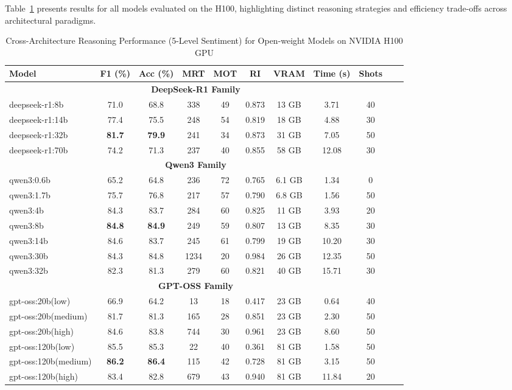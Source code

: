 \documentclass[conference]{IEEEtran}
\begin{document}
Table~\ref{tab:cross_architecture_results} presents results for all models evaluated on the H100, highlighting distinct reasoning strategies and efficiency trade-offs across architectural paradigms.

\begin{table}[htbp]
\caption{Cross-Architecture Reasoning Performance (5-Level Sentiment) for Open-weight Models on NVIDIA H100 GPU}
\centering
\begin{tabular}{lcccccccccc}
\toprule
\textbf{Model} & \textbf{F1 (\%)} & \textbf{Acc (\%)} & \textbf{MRT} & \textbf{MOT} & \textbf{RI} & \textbf{VRAM} & \textbf{Time (s)} & \textbf{Shots} \\
\midrule
\multicolumn{9}{c}{\textbf{DeepSeek-R1 Family}} \\
\midrule
deepseek-r1:8b & 71.0 & 68.8 & 338 & 49 & 0.873 & 13 GB & 3.71 & 40 \\
deepseek-r1:14b & 77.4 & 75.5 & 248 & 54 & 0.819 & 18 GB & 4.88 & 30 \\
deepseek-r1:32b & \textbf{81.7} & \textbf{79.9} & 241 & 34 & 0.873 & 31 GB & 7.05 & 50 \\
deepseek-r1:70b & 74.2 & 71.3 & 237 & 40 & 0.855 & 58 GB & 12.08 & 30 \\
\midrule
\multicolumn{9}{c}{\textbf{Qwen3 Family}} \\
\midrule
qwen3:0.6b & 65.2 & 64.8 & 236 & 72 & 0.765 & 6.1 GB & 1.34 & 0 \\
qwen3:1.7b & 75.7 & 76.8 & 217 & 57 & 0.790 & 6.8 GB & 1.56 & 50 \\
qwen3:4b & 84.3 & 83.7 & 284 & 60 & 0.825 & 11 GB & 3.93 & 20 \\
qwen3:8b & \textbf{84.8} & \textbf{84.9} & 249 & 59 & 0.807 & 13 GB & 8.35 & 30 \\
qwen3:14b & 84.6 & 83.7 & 245 & 61 & 0.799 & 19 GB & 10.20 & 30 \\
qwen3:30b & 84.3 & 84.8 & 1234 & 20 & 0.984 & 26 GB & 12.35 & 50 \\
qwen3:32b & 82.3 & 81.3 & 279 & 60 & 0.821 & 40 GB & 15.71 & 30 \\
\midrule
\multicolumn{9}{c}{\textbf{GPT-OSS Family}} \\
\midrule
gpt-oss:20b(low) & 66.9 & 64.2 & 13 & 18 & 0.417 & 23 GB & 0.64 & 40 \\
gpt-oss:20b(medium) & 81.7 & 81.3 & 165 & 28 & 0.851 & 23 GB & 2.30 & 50 \\
gpt-oss:20b(high) & 84.6 & 83.8 & 744 & 30 & 0.961 & 23 GB & 8.60 & 50 \\
gpt-oss:120b(low) & 85.5 & 85.3 & 22 & 40 & 0.361 & 81 GB & 1.58 & 50 \\
gpt-oss:120b(medium) & \textbf{86.2} & \textbf{86.4} & 115 & 42 & 0.728 & 81 GB & 3.15 & 50 \\
gpt-oss:120b(high) & 83.4 & 82.8 & 679 & 43 & 0.940 & 81 GB & 11.84 & 20 \\
\bottomrule
\end{tabular}
\label{tab:cross_architecture_results}


\end{table}
\end{document}
